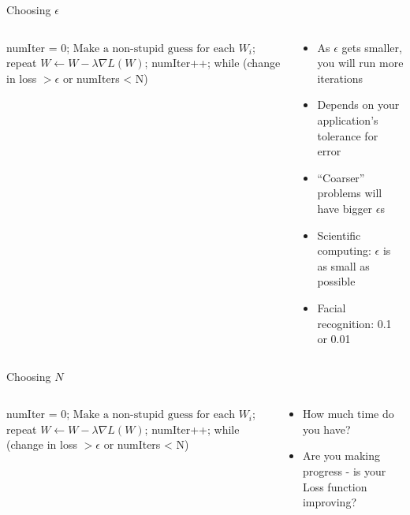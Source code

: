 \documentclass[aspectratio=169]{beamer}
\begin{document}
\begin{frame}[fragile]{Choosing $\epsilon$}

\begin{columns}
\begin{column}{0.4\textwidth}
\begin{SQL}
numIter = 0;
$\textrm{Make a non-stupid guess for each } W_i$;
repeat {
  $W \leftarrow W - \lambda \nabla L (W)$;
  numIter++;
} while (change in loss $> \epsilon$ 
		or numIters < N)
\end{SQL}
\end{column}
\begin{column}{0.6\textwidth}

\begin{itemize}
\item As $\epsilon$ gets smaller, you will run more iterations
\item Depends on your application's tolerance for error
\item ``Coarser'' problems will have bigger  $\epsilon$s
\item Scientific computing: $\epsilon$ is as small as possible
\item Facial recognition: 0.1 or 0.01
\end{itemize}
\end{column}
\end{columns}

\end{frame}
\begin{frame}[fragile]{Choosing $N$}

\begin{columns}
\begin{column}{0.4\textwidth}
\begin{SQL}
numIter = 0;
$\textrm{Make a non-stupid guess for each } W_i$;
repeat {
  $W \leftarrow W - \lambda \nabla L (W)$;
  numIter++;
} while (change in loss $> \epsilon$ 
		or numIters < N)
\end{SQL}
\end{column}
\begin{column}{0.6\textwidth}

\begin{itemize}
\item How much time do you have?
\item Are you making progress - is your Loss function improving?
\end{itemize}
\end{column}
\end{columns}

\end{frame}
\end{document}
